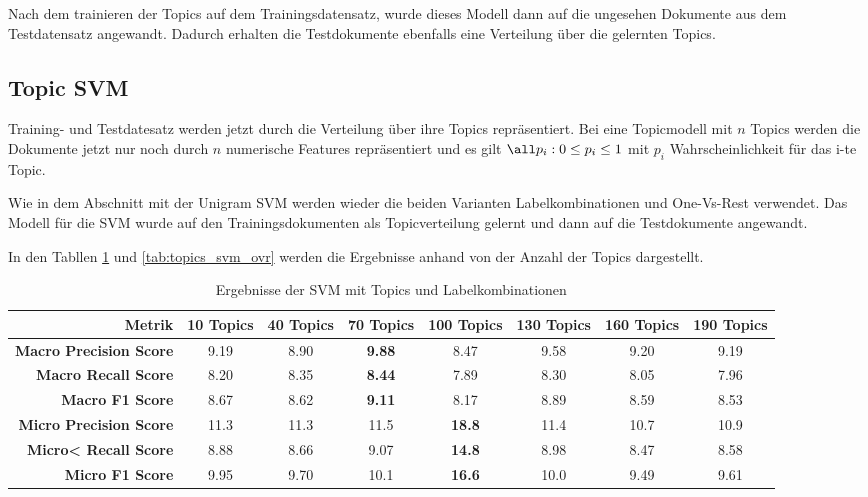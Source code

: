 Nach dem trainieren der Topics auf dem Trainingsdatensatz, wurde dieses Modell dann auf die ungesehen Dokumente aus
dem Testdatensatz angewandt. Dadurch erhalten die Testdokumente ebenfalls eine Verteilung über die gelernten Topics.

\subsection{Topic SVM}
\label{sub:topic_svm}
Training- und Testdatesatz werden jetzt durch die Verteilung über ihre Topics repräsentiert. Bei eine Topicmodell mit $n$ Topics
werden die Dokumente jetzt nur noch durch $n$ numerische Features repräsentiert und es gilt $\all p_i: 0 \le p_i \le 1 $ mit $p_i$
Wahrscheinlichkeit für das i-te Topic.

Wie in dem Abschnitt mit der Unigram SVM werden wieder die beiden Varianten Labelkombinationen und One-Vs-Rest verwendet.
Das Modell für die SVM wurde auf den Trainingsdokumenten als Topicverteilung gelernt und dann auf die Testdokumente angewandt.

In den Tabllen \ref{tab:topics_svm_labelcombs} und \ref{tab:topics_svm_ovr} werden die Ergebnisse anhand von der Anzahl der Topics
dargestellt.

\begin{table}[h]
    \begin{tabular}{r|ccccccc}
        \tiny\textbf{Metrik} & \tiny\textbf{10 Topics} &\tiny \textbf{40 Topics} &\tiny \textbf{70 Topics} &\tiny \textbf{100 Topics} & \tiny \textbf{130 Topics} &  \tiny \textbf{160 Topics} &  \tiny \textbf{190 Topics} \\
        \hline
        \tiny \textbf{Macro Precision Score}  & \tiny 9.19 & \tiny 8.90& \tiny \textbf{9.88}&\tiny 8.47&\tiny 9.58&\tiny 9.20&\tiny 9.19\\
        \tiny \textbf{Macro Recall Score}     & \tiny 8.20 & \tiny 8.35& \tiny \textbf{8.44}&\tiny 7.89&\tiny 8.30&\tiny 8.05&\tiny 7.96\\
        \tiny \textbf{Macro F1 Score}        & \tiny 8.67 & \tiny 8.62& \tiny \textbf{9.11}&\tiny 8.17&\tiny 8.89&\tiny 8.59&\tiny 8.53\\
        \tiny \textbf{Micro Precision Score} & \tiny 11.3 & \tiny 11.3& \tiny 11.5&\tiny \textbf{18.8}&\tiny 11.4&\tiny 10.7&\tiny 10.9\\
        \tiny \textbf{Micro< Recall Score}    & \tiny 8.88 & \tiny 8.66& \tiny 9.07&\tiny \textbf{14.8}&\tiny 8.98&\tiny 8.47&\tiny 8.58\\
        \tiny \textbf{Micro F1 Score}        & \tiny 9.95 & \tiny 9.70& \tiny 10.1&\tiny \textbf{16.6}&\tiny 10.0&\tiny 9.49&\tiny 9.61\\
    \end{tabular}
    \caption{Ergebnisse der SVM mit Topics und Labelkombinationen}
    \label{tab:topics_svm_labelcombs}
\end{table}

